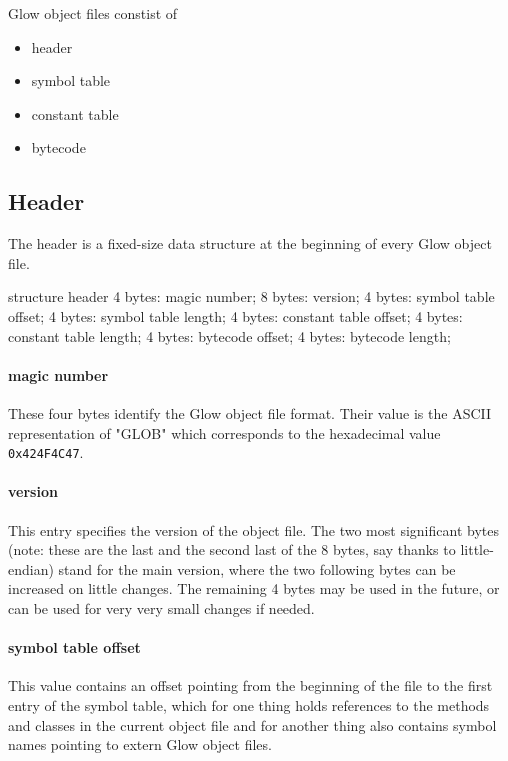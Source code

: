 \documentclass[12pt]{article}
\begin{document}
Glow object files constist of
\begin{itemize}
\item header
\item symbol table
\item constant table
\item bytecode
\end{itemize}

\subsection*{Header}
The header is a fixed-size data structure at the beginning of every Glow object file.

\begin{code}[language=C]
structure header {
    4 bytes: magic number;
    8 bytes: version;
    4 bytes: symbol table offset;
    4 bytes: symbol table length;
    4 bytes: constant table offset;
    4 bytes: constant table length;
    4 bytes: bytecode offset;
    4 bytes: bytecode length;
}
\end{code}

\paragraph{magic number}
    These four bytes identify the Glow object file format.
    Their value is the ASCII representation of "GLOB" which
    corresponds to the hexadecimal value \texttt{0x424F4C47}.

\paragraph{version}
    This entry specifies the version of the object file. The two most
    significant bytes (note: these are the last and the second last of the 8 bytes,
    say thanks to little-endian) stand for the main version, where the two following
    bytes can be increased on little changes. The remaining 4 bytes may be used in the
    future, or can be used for very very small changes if needed.

\paragraph{symbol table offset}
    This value contains an offset pointing from the beginning of the file to the first entry
    of the symbol table, which for one thing holds references to the methods and classes in the
    current object file and for another thing also contains symbol names pointing to
    extern Glow object files.
\end{document}
